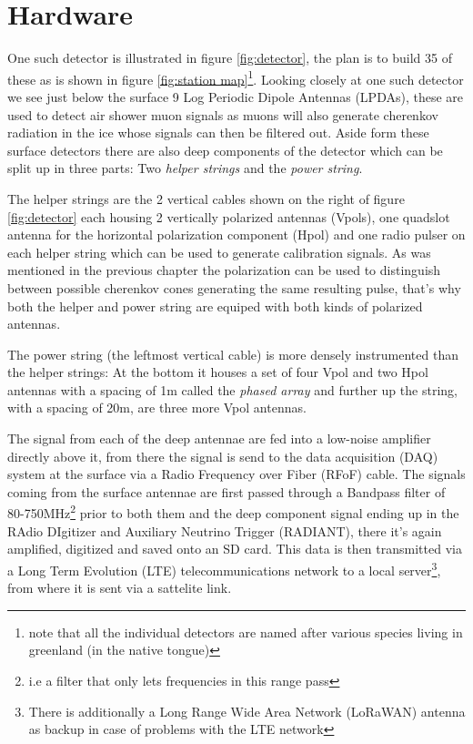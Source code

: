 \documentclass[11pt,a4paper,faculty=we,language=en,doctype=report]{cls/ugent-doc}
\begin{document}
\section{Hardware}
One such detector is illustrated in figure \ref{fig:detector}, the plan is to
build 35 of these as is shown in figure \ref{fig:station map}\footnote{note
that all the individual detectors are named after various species living in
greenland (in the native tongue)}. Looking closely at one such detector we see
just below the surface 9 Log Periodic Dipole Antennas (LPDAs), these are used
to detect air shower muon signals as muons will also generate cherenkov
radiation in the ice whose signals can then be filtered out.  Aside form these
surface detectors there are also deep components of the detector which can be
split up in three parts: Two \textit{helper strings} and the \textit{power
string}.

The helper strings are the 2 vertical cables shown on the right of figure
\ref{fig:detector} each housing 2 vertically polarized antennas (Vpols), one
quadslot antenna for the horizontal polarization component (Hpol) and one radio
pulser on each helper string which can be used to generate calibration signals.
As was mentioned in the previous chapter the polarization can be used to
distinguish between possible cherenkov cones generating the same resulting
pulse, that's why both the helper and power string are equiped with both kinds
of polarized antennas.

The power string (the leftmost vertical cable) is more densely instrumented
than the helper strings: At the bottom it houses a set of four Vpol and two
Hpol antennas with a spacing of 1m called the \textit{phased array} and further
up the string, with a spacing of 20m, are three more Vpol antennas.

The signal from each of the deep antennae are fed into a low-noise amplifier
directly above it, from there the signal is send to the data acquisition (DAQ)
system at the surface via a Radio Frequency over Fiber (RFoF) cable.  The
signals coming from the surface antennae are first passed through a Bandpass
filter of 80-750MHz\footnote{i.e a filter that only lets frequencies in this
range pass} prior to both them and the deep component signal ending up in the
RAdio DIgitizer and Auxiliary Neutrino Trigger (RADIANT), there it's again
amplified, digitized and saved onto an SD card. This data is then transmitted
via a Long Term Evolution (LTE) telecommunications network to a local
server\footnote{There is additionally a Long Range Wide Area Network (LoRaWAN)
antenna as backup in case of problems with the LTE network}, from where it is
sent via a sattelite link.
\end{document}
